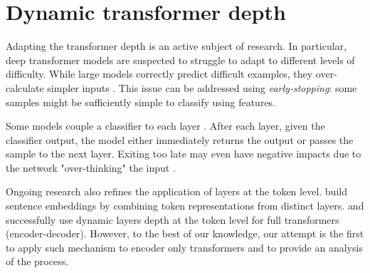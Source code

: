 



\section{Dynamic transformer depth}
 Adapting the transformer depth is an active subject of research. In particular, deep transformer models are suspected to struggle to adapt to different levels of difficulty. While large models correctly predict difficult examples, they over-calculate simpler inputs \parencite{liu_20}. This issue can be addressed using \textit{early-stopping}: some samples might be sufficiently simple to classify using  features. 

Some models couple a classifier to each layer \parencite{zhou_20b, liu_20, xin_20}. After each layer, given the classifier output, the model either immediately returns the output or passes the sample to the next layer. 
Exiting too late may even have negative impacts due to the network "over-thinking" the input \parencite{kaya_19}. 

Ongoing research also refines the application of layers at the token level. \textcite{wang_20} build sentence embeddings by combining token representations from distinct layers. \textcite{elbayad_20} and \textcite{dehghani_19} successfully use dynamic layers depth at the token level for full transformers (encoder-decoder). However, to the best of our knowledge, our attempt is the first to apply such mechanism to encoder only transformers and to provide an analysis of the process. 

